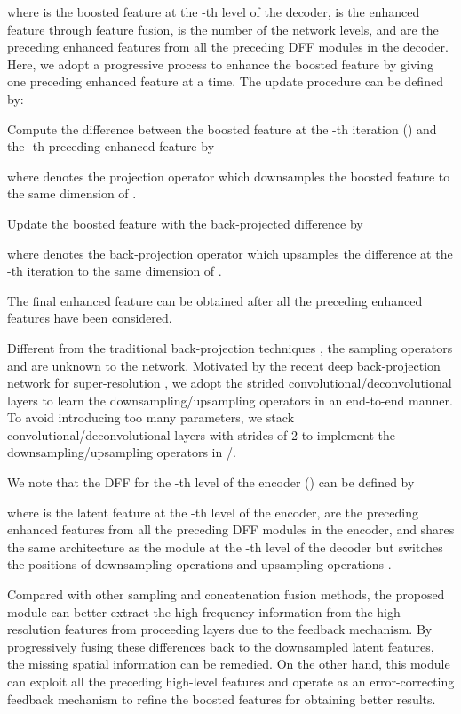 \documentclass[10pt,twocolumn,letterpaper]{article}
\begin{document}
  where  is the boosted feature at the -th level of the decoder,
   is the enhanced feature through feature fusion,
   is the number of the network levels,
  and  are the preceding enhanced features from all the  preceding DFF modules in the decoder.
Here, we adopt a progressive process to enhance the boosted feature  by giving one preceding enhanced feature  at a time.
The update procedure can be defined by:
  \begin{compactitem}
\item Compute the difference  between the boosted feature at the -th iteration  () and the -th preceding enhanced feature  by
     
where  denotes the projection operator which downsamples the boosted feature  to the same dimension of .
\item Update the boosted feature  with the back-projected difference by
    \vspace{-2mm}
    
    where  denotes the back-projection operator which upsamples the difference  at the -th iteration to the same dimension of .
    \item The final enhanced feature  can be obtained after all the preceding enhanced features have been considered.
  \end{compactitem}
Different from the traditional back-projection techniques \cite{Irani1991,BiBP}, the sampling operators  and  are unknown to the network.
Motivated by the recent deep back-projection network for super-resolution \cite{DBPN},
we adopt the strided convolutional/deconvolutional layers to learn the downsampling/upsampling operators in an end-to-end manner.
To avoid introducing too many parameters, we stack  convolutional/deconvolutional layers with strides of 2 to implement the downsampling/upsampling operators in /.
  
  We note that the DFF for the -th level of the encoder () can be defined by
\vspace{-2mm}
  
  where  is the latent feature at the -th level of the encoder,
   are the preceding enhanced features from all the  preceding DFF modules in the encoder,
  and  shares the same architecture as the module  at the -th level of the decoder but switches the positions of downsampling operations  and upsampling operations .


  Compared with other sampling and concatenation fusion methods, the proposed module can better extract the high-frequency information from the high-resolution features from proceeding layers due to the feedback mechanism.
By progressively fusing these differences back to the downsampled latent features, the missing spatial information can be remedied.
On the other hand, this module can exploit all the preceding high-level features and operate as an error-correcting feedback mechanism to refine the boosted features for obtaining better results.
  
\end{document}
